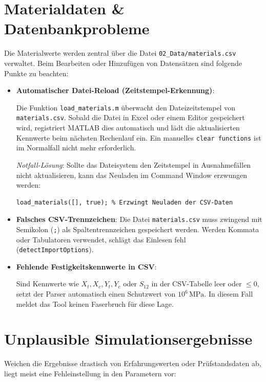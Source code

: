 \section{Materialdaten \& Datenbankprobleme} \label{sec:ts_cache}

Die Materialwerte werden zentral über die Datei \texttt{02\_Data/materials.csv} verwaltet. Beim Bearbeiten oder Hinzufügen von Datensätzen sind folgende Punkte zu beachten:

\begin{itemize}
    \item \textbf{Automatischer Datei-Reload (Zeitstempel-Erkennung)}: \par
    Die Funktion \texttt{load\_materials.m} überwacht den Dateizeitstempel von \texttt{materials.csv}. Sobald die Datei in Excel oder einem Editor gespeichert wird, registriert MATLAB dies automatisch und lädt die aktualisierten Kennwerte beim nächsten Rechenlauf ein. Ein manuelles \texttt{clear functions} ist im Normalfall nicht mehr erforderlich. \par
    \textit{Notfall-Lösung}: Sollte das Dateisystem den Zeitstempel in Ausnahmefällen nicht aktualisieren, kann das Neuladen im Command Window erzwungen werden:
    \begin{lstlisting}[style=vscodeLightMatlab]
    load_materials([], true); % Erzwingt Neuladen der CSV-Daten
    \end{lstlisting}

    \item \textbf{Falsches CSV-Trennzeichen}:
    Die Datei \texttt{materials.csv} muss zwingend mit Semikolon (\texttt{;}) als Spaltentrennzeichen gespeichert werden. Werden Kommata oder Tabulatoren verwendet, schlägt das Einlesen fehl (\texttt{detectImportOptions}).

    \item \textbf{Fehlende Festigkeitskennwerte in CSV}: \par
    Sind Kennwerte wie $X_t, X_c, Y_t, Y_c$ oder $S_{12}$ in der CSV-Tabelle leer oder $\le 0$, setzt der Parser automatisch einen Schutzwert von $10^6\,\text{MPa}$. In diesem Fall meldet das Tool keinen Faserbruch für diese Lage.
\end{itemize}

\section{Unplausible Simulationsergebnisse} \label{sec:ts_ergebnisse}

Weichen die Ergebnisse drastisch von Erfahrungswerten oder Prüfstandsdaten ab, liegt meist eine Fehleinstellung in den Parametern vor:

